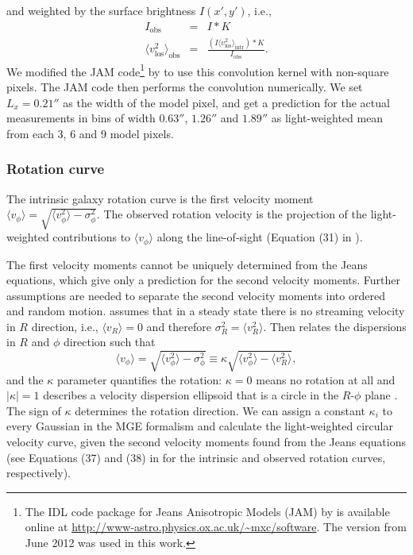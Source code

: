 \documentclass[useAMS,usenatbib]{mnras}
\begin{document}
and weighted by the surface brightness $I(x',y')$, i.e.,
\begin{eqnarray}
I_\text{obs} &=& I \ast K\\
\langle v_\text{los}^2 \rangle_\text{obs} &=& \frac{(I \langle v_\text{los}^2\rangle_\text{intr}) \ast K}{I_\text{obs}}.
\end{eqnarray}
We modified the JAM code\footnote{The IDL code package for Jeans Anisotropic Models (JAM) by \citet{Cap08} is available online at \url{http://www-astro.physics.ox.ac.uk/~mxc/software}. The version from June 2012 was used in this work.} by \citet{Cap08} to use this convolution kernel with non-square pixels. The JAM code then performs the convolution numerically. We set $L_x = 0.21''$ as the width of the model pixel, and get a prediction for the actual measurements in bins of width $0.63''$, $1.26''$ and $1.89''$ \citep{SWELLSV} as light-weighted mean from each 3, 6 and 9 model pixels.

\subsubsection{Rotation curve} \label{sec:model_JAM_rotation}

The intrinsic galaxy rotation curve is the first velocity moment $\langle v_\phi\rangle = \sqrt{\langle v_\phi^2 \rangle - \sigma_\phi^2}$. The observed rotation velocity is the projection of the light-weighted contributions to $\langle v_\phi\rangle$ along the line-of-sight (Equation (31) in \citet{Cap08}).

The first velocity moments cannot be uniquely determined from the Jeans equations, which give only a prediction for the second velocity moments. Further assumptions are needed to separate the second velocity moments into ordered and random motion. \citet{Cap08} assumes that in a steady state there is no streaming velocity in $R$ direction, i.e., $\langle v_R \rangle = 0$ and therefore $\sigma_R^2 = \langle v_R^2 \rangle$. Then \citet{Cap08} relates the dispersions in $R$ and $\phi$ direction such that
\begin{equation}
\langle v_\phi\rangle = \sqrt{\langle v_\phi^2 \rangle - \sigma_\phi^2} \equiv \kappa \sqrt{\langle v_\phi^2 \rangle - \langle v_R^2 \rangle},
\end{equation}
and the $\kappa$ parameter quantifies the rotation: $\kappa = 0$ means no rotation at all and $|\kappa| = 1$ describes a velocity dispersion ellipsoid that is a circle in the $R$-$\phi$ plane \citep{Cap08}. The sign of $\kappa$ determines the rotation direction. We can assign a constant $\kappa_i$ to every Gaussian in the MGE formalism and calculate the light-weighted circular velocity curve, given the second velocity moments found from the Jeans equations (see Equations (37) and (38) in \citet{Cap08} for the intrinsic and observed rotation curves, respectively).
\end{document}
